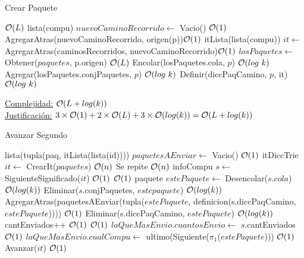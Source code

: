 \begin{Algoritmos}
\begin{algorithm}
\caption{Crear Paquete}
\begin{algorithmic}[1]
    \Comment $\mathcal{O}(L)$
   \State lista(compu) $nuevoCaminoRecorrido \gets$ Vacio() \Comment $\mathcal{O}(1)$
   \State AgregarAtras(nuevoCaminoRecorrido, origen(p))\Comment  $\mathcal{O}(1)$
   \State itLista(lista(compu)) $it \gets$ AgregarAtras(caminosRecorridos, nuevoCaminoRecorrido)\Comment $\mathcal{O}(1)$
   \State $losPaquetes \gets $ Obtener($paquetes$, p.origen) \Comment $\mathcal{O}(L)$
   \State Encolar(losPaquetes.cola, $p$) \Comment $\mathcal{O}(log \ k)$
   \State Agregar(losPaquetes.conjPaquetes, $p$) \Comment $\mathcal{O}(log \ k)$
   \State Definir(diccPaqCamino, $p$, it) \Comment $\mathcal{O}(log \ k)$
   \EndIf
   \EndProcedure
\end{algorithmic}
\underline{Complejidad:} $\mathcal{O}(L + log(k))$\\
\underline{Justificación:} $3 \times \mathcal{O}(1)+2 \times \mathcal{O}(L)+3\times \mathcal{O}(log(k)) = \mathcal{O}(L + log(k))$
\end{algorithm}


\begin{algorithm}
\caption{Avanzar Segundo}
\begin{algorithmic}[1]
  
  \State lista(tupla(paq, itLista(lista(id)))) $paquetesAEnviar \gets$ Vacio() \Comment  $\mathcal{O}(1)$
  \State itDiccTrie $it \gets$ CrearIt($paquetes$) \Comment  $\mathcal{O}(n)$
   \Comment Se repite $\mathcal{O}(n)$  
  	\State infoCompu $s \gets$ SiguienteSignificado($it$) \Comment  $\mathcal{O}(1)$ 
  	 \Comment  $\mathcal{O}(1)$
  		\State paquete $estePaquete \gets$ Desencolar($s$.$cola$) \Comment  $\mathcal{O}(log(k))$
  		\State Eliminar($s$.conjPaquetes, $estepaquete$) \Comment  $\mathcal{O}(log(k))$
		\State AgregarAtras(paquetesAEnviar(tupla($estePaquete$, definicion(s.diccPaqCamino, $estePaquete$)))) 
		\State\Comment  $\mathcal{O}(1)$
		\State Eliminar(s.diccPaqCamino, $estePaquete$)  \Comment  $\mathcal{O}(log(k))$
		\State cantEnviados++ \Comment  $\mathcal{O}(1)$
		 \Comment  $\mathcal{O}(1)$
		   \State $laQueMasEnvio.cuantosEnvio \gets$ $s$.cantEnviados \Comment  $\mathcal{O}(1)$
		   \State $laQueMasEnvio.cualCompu \gets$ ultimo(Siguiente($\pi_1$($estePaquete$))) \Comment  $\mathcal{O}(1)$
		\EndIf 
	\EndIf
	\State Avanzar($it$) \Comment  $\mathcal{O}(1)$
  \EndWhile 
   

\end{algorithmic}
\end{algorithm}
\end{Algoritmos}
